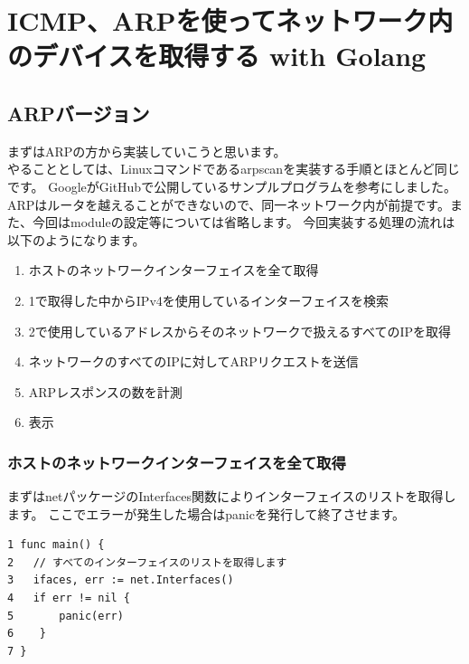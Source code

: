 
\chapter{ICMP、ARPを使ってネットワーク内のデバイスを取得する with Golang}
\section{ARPバージョン}
まずはARPの方から実装していこうと思います。\\
やることとしては、Linuxコマンドであるarpscanを実装する手順とほとんど同じです。
GoogleがGitHubで公開しているサンプルプログラムを参考にしました\cite{arpscan}。
ARPはルータを越えることができないので、同一ネットワーク内が前提です。また、今回はmoduleの設定等については省略します。
今回実装する処理の流れは以下のようになります。
\begin{enumerate}
    \item ホストのネットワークインターフェイスを全て取得
    \item 1で取得した中からIPv4を使用しているインターフェイスを検索
    \item 2で使用しているアドレスからそのネットワークで扱えるすべてのIPを取得
    \item ネットワークのすべてのIPに対してARPリクエストを送信
    \item ARPレスポンスの数を計測
    \item 表示
\end{enumerate}
\subsection{ホストのネットワークインターフェイスを全て取得}
まずはnetパッケージのInterfaces関数によりインターフェイスのリストを取得します。
ここでエラーが発生した場合はpanicを発行して終了させます。
\begin{tcolorbox}[breakable]
    \begin{verbatim}
1 func main() {
2   // すべてのインターフェイスのリストを取得します
3	ifaces, err := net.Interfaces()
4	if err != nil {
5	    panic(err)
6	 }
7 }
    \end{verbatim}
\end{tcolorbox}

